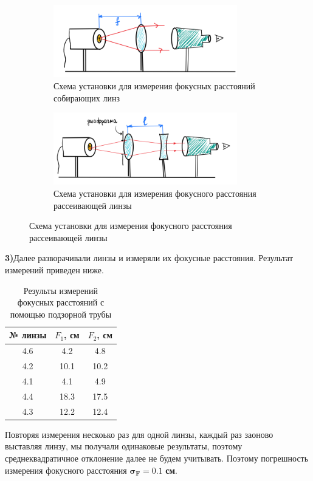 \begin{figure}[h!]
    \centering
    \begin{subfigure}{0.45\linewidth}
        \centering
        \includegraphics[width=8cm]{images/setup1.png}
        \caption{Схема установки для измерения фокусных расстояний собирающих линз}
    \end{subfigure}
    \hfill
    \begin{subfigure}{0.45\linewidth}
        \centering
        \includegraphics[width=8cm]{images/setup1(2).png}
        \caption{Схема установки для измерения фокусного расстояния рассеивающей линзы}
    \end{subfigure}
\end{figure}

\indent \textbf{3)}Далее разворачивали линзы и измеряли их фокусные расстояния. Результат измерений приведен ниже.

\begin{table}[h]
    \centering
    \begin{tabular}{|c|c|c|}
        \hline
        № линзы & $F_1$, см   & $F_2$, см   \\ \hline
        4.6     & 4.2       & 4.8       \\ \hline
        4.2     & 10.1      & 10.2      \\ \hline
        4.1     & 4.1       & 4.9       \\ \hline
        4.4     & 18.3      & 17.5      \\ \hline
        4.3     & 12.2      & 12.4      \\ \hline
    \end{tabular}
    \caption{Результы измерений фокусных расстояний с помощью подзорной трубы}
\end{table}

\indent Повторяя измерения нескоько раз для одной линзы, каждый раз заоново выставляя линзу, мы получали одинаковые результаты, поэтому среднеквадратичное отклонение далее не будем учитывать. Поэтому погрешность измерения фокусного расстояния $\bm{\sigma_F = 0.1}$ \textbf{см}.


